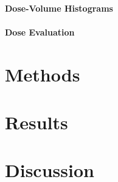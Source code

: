 \documentclass[a4paper]{article}
\begin{document}
	\paragraph{Dose-Volume Histograms}
	\paragraph{Dose Evaluation}
	
	\section{Methods}
	
	\section{Results}
	
	\section{Discussion}
	
	
\end{document}
